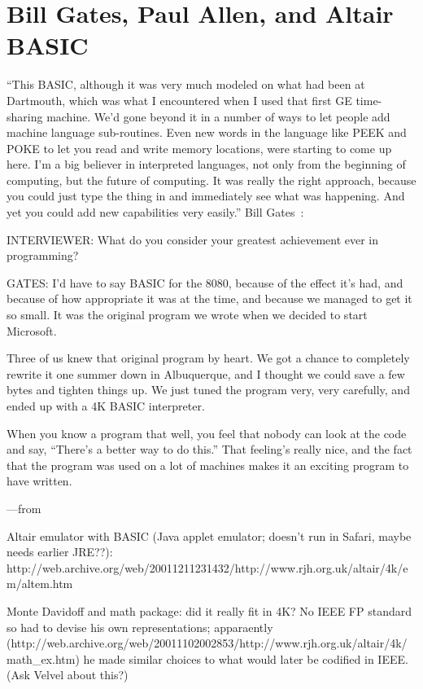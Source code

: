 \documentclass{article}
\begin{document}
\section{Bill Gates, Paul Allen, and Altair BASIC}

``This BASIC, although it was very much modeled on what had been at
Dartmouth, which was what I encountered when I used that first GE
time-sharing machine. We'd gone beyond it in a number of ways to let
people add machine language sub-routines. Even new words in the language
like PEEK and POKE to let you read and write memory locations, were
starting to come up here. I'm a big believer in interpreted languages,
not only from the beginning of computing, but the future of
computing. It was really the right approach, because you could just type
the thing in and immediately see what was happening. And yet you could
add new capabilities very easily.'' Bill Gates~\cite{smithsonian_interview}:

INTERVIEWER: What do you consider your greatest achievement ever in programming?

GATES: I'd have to say BASIC for the 8080, because of the effect it's
had, and because of how appropriate it was at the time, and because we
managed to get it so small. It was the original program we wrote when we
decided to start Microsoft.

Three of us knew that original program by heart. We got a chance to
completely rewrite it one summer down in Albuquerque, and I thought we
could save a few bytes and tighten things up. We just tuned the program
very, very carefully, and ended up with a 4K BASIC interpreter.

When you know a program that well, you feel that nobody can look at the
code and say, ``There's a better way to do this.'' That feeling's really
nice, and the fact that the program was used on a lot of machines makes
it an exciting program to have written.

---from \cite{programmers_at_work}

Altair emulator with BASIC (Java applet emulator; doesn't run in Safari,
maybe needs earlier JRE??): 
http://web.archive.org/web/20011211231432/http://www.rjh.org.uk/altair/4k/em/altem.htm

Monte Davidoff and math package: did it really fit in 4K?  No IEEE FP
standard so had to devise his own representations; apparaently
(http://web.archive.org/web/20011102002853/http://www.rjh.org.uk/altair/4k/math\_ex.htm)
he made similar choices to what would later be codified in IEEE.  (Ask
Velvel about this?)
\end{document}
